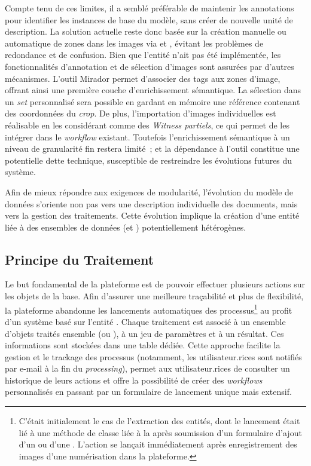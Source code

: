 Compte tenu de ces limites, il a semblé préférable de maintenir les
annotations \sas pour identifier les instances de base du modèle, sans
créer de nouvelle unité de description. La solution actuelle reste donc
basée sur la création manuelle ou automatique de zones dans les images
via \iiif et \sas, évitant les problèmes de redondance et de confusion.
Bien que l'entité \graphical n'ait pas été implémentée, les
fonctionnalités d'annotation et de sélection d'images sont assurées par
d'autres mécanismes. L'outil Mirador permet d'associer des tags aux
zones d'image, offrant ainsi une première couche d'enrichissement
sémantique. La sélection dans un \emph{set} personnalisé sera possible en
gardant en mémoire une référence contenant des coordonnées du
\emph{crop}. De plus, l'importation d'images individuelles est
réalisable en les considérant comme des \emph{Witness partiels}, ce qui
permet de les intégrer dans le \textit{workflow} existant. Toutefois
l'enrichissement sémantique à un niveau de granularité fin restera
limité~; et la dépendance à l'outil \sas constitue une potentielle dette
technique, susceptible de restreindre les évolutions futures du système.

Afin de mieux répondre aux exigences de modularité, l'évolution du
modèle de données s'oriente non pas vers une description individuelle
des documents, mais vers la gestion des traitements. Cette évolution
implique la création d'une entité \tr
liée à des ensembles de données (\ds et
\rs) potentiellement hétérogènes.

\hypertarget{principe-du-traitement}{%
\subsection{Principe du Traitement}\label{principe-du-traitement}}

Le but fondamental de la plateforme est de pouvoir effectuer plusieurs
actions sur les objets de la base. Afin d'assurer une meilleure
traçabilité et plus de flexibilité, la plateforme abandonne les
lancements automatiques des processus\footnote{C'était initialement le
  cas de l'extraction des entités, dont le lancement était lié à une
  méthode de classe liée à la \digit après soumission d'un
  formulaire d'ajout d'un \wit ou d'une \ser. L'action se
  lançait immédiatement après enregistrement des images d'une
  numérisation dans la plateforme.} au profit d'un système basé sur
l'entité \tr. Chaque traitement est associé à un ensemble
d'objets traités ensemble (\ds ou \rs), à un jeu de
paramètres et à un résultat. Ces informations sont stockées dans une
table dédiée. Cette approche facilite la gestion et le trackage des
processus (notamment, les utilisateur.rices sont notifiés par e-mail à la fin
du \textit{processing}), permet aux utilisateur.rices de consulter un historique de
leurs actions et offre la possibilité de créer des \textit{workflows}
personnalisés en passant par un formulaire de lancement unique mais
extensif.

